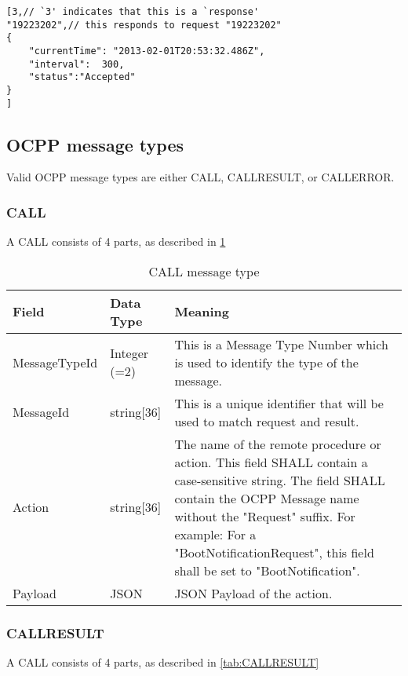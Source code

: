 \documentclass[12pt,openany,a4paper]{book}
\begin{document}
\begin{verbatim}
[3,// `3' indicates that this is a `response'
"19223202",// this responds to request "19223202"
{
    "currentTime": "2013-02-01T20:53:32.486Z",
    "interval":  300,
    "status":"Accepted"
}
]
\end{verbatim}

\pagebreak

\subsection{OCPP message types}

Valid OCPP message types are either CALL, CALLRESULT, or CALLERROR.

\subsubsection{CALL}
A CALL consists of 4 parts, as described in \ref{tab:CALL}

\begin{table}[htp]
\begin{tabular}{ |p{3cm}|p{2.5cm}|p{9cm}| }
 \hline
\textbf{Field} & \textbf{Data Type} & \textbf{Meaning}
\\
 \hline MessageTypeId & Integer (=2)& This is a Message Type Number which is used to identify the type of the message.\\
 \hline MessageId & string[36] & This is a unique identifier that will be used to match request and result.\\
 \hline Action & string[36] & The name of the remote procedure or action. This field SHALL contain a case-sensitive string.
The field SHALL contain the OCPP Message name without the "Request" suffix. For example: For
a "BootNotificationRequest", this field shall be set to "BootNotification".\\
 \hline Payload & JSON & JSON Payload of the action.\\
 \hline
\end{tabular}
\caption{CALL message type \cite{ocpp4}}
\label{tab:CALL}
\end{table}


\subsubsection{CALLRESULT}
A CALL consists of 4 parts, as described in \ref{tab:CALLRESULT}
\end{document}
